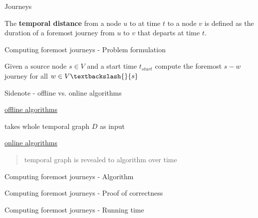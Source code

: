 \documentclass{beamer}
\begin{document}
\begin{frame}{Journeys}
	\begin{tcolorbox}[definitionstyle, title=Definition: Temporal distance]
    The \textbf{temporal distance} from a node $u$ to at time $t$ to a node $v$ is defined as the duration of a foremost journey from $u$ to $v$ that departs at time $t$.
	\end{tcolorbox}
\end{frame}



\begin{frame}{Computing foremost journeys - Problem formulation}
  \begin{center}
    Given a source node $s \in V$ and a start time $t_{start}$ compute the foremost $s-w$ journey for all $w \in V \textbackslash{} \{ s \}$
  \end{center}
\end{frame}

\begin{frame}{Sidenote - offline vs. online algorithms}
  \begin{minipage}{0.45\textwidth}
    \underline{offline algorithms}
    \begin{center}
      takes whole temporal graph $D$ as input
    \end{center}
  \end{minipage} \hfill 
  \begin{minipage}{0.45\textwidth}
    \underline{online algorithms}
    \begin{quote}
    temporal graph is revealed to algorithm over time
    \end{quote}
  \end{minipage}
\end{frame}

\begin{frame}{Computing foremost journeys - Algorithm}

\end{frame}

\begin{frame}{Computing foremost journeys - Proof of correctness}


\end{frame}
\begin{frame}{Computing foremost journeys - Running time}

\end{frame}
\end{document}
